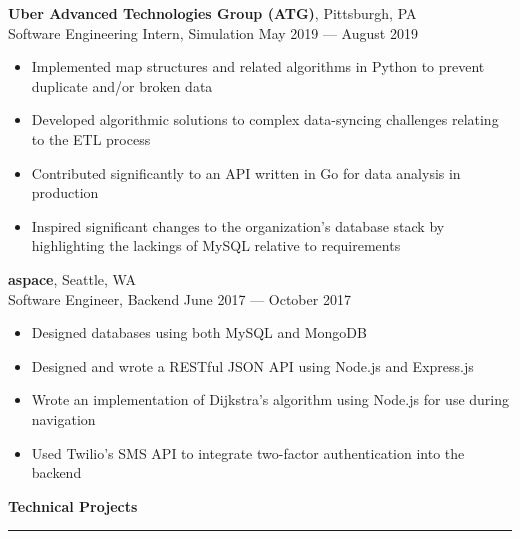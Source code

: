 \documentclass[11pt]{article}
\begin{document}
\begin{flushleft}
		\textbf{Uber Advanced Technologies Group (ATG)}, Pittsburgh, PA\\
		{\small Software Engineering Intern, Simulation \hfill May 2019 --- August 2019}
		\vspace{-1.25mm}
		\begin{itemize}
			\item Implemented map structures and related algorithms in Python to prevent duplicate and/or broken data
			\vspace{-1.5mm}
			\item Developed algorithmic solutions to complex data-syncing challenges relating to the ETL process
			\vspace{-1.5mm}
			\item Contributed significantly to an API written in Go for data analysis in production
			\vspace{-1.5mm}
			\item Inspired significant changes to the organization's database stack by highlighting the lackings of MySQL relative to requirements
		\end{itemize}
	
		\textbf{aspace}, Seattle, WA\\
		{\small Software Engineer, Backend \hfill June 2017 --- October 2017}
		\vspace{-1.25mm}
		\begin{itemize}
			\item Designed databases using both MySQL and MongoDB
			\vspace{-1.5mm}
			\item Designed and wrote a RESTful JSON API using Node.js and Express.js
			\vspace{-1.5mm}
			\item Wrote an implementation of Dijkstra's algorithm using Node.js for use during navigation
			\vspace{-1.5mm}
			\item Used Twilio's SMS API to integrate two-factor authentication into the backend
		\end{itemize}
		
		\vspace{1.35mm}
		{\large \raggedright \textbf{Technical Projects}}
		\vspace{1.25mm}
	
		\hrule
	

\end{flushleft}
\end{document}

